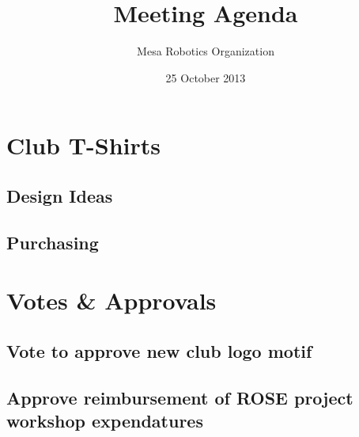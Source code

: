 \documentclass{article}
\begin{document}

\title{Meeting Agenda}
\author{Mesa Robotics Organization}
\date{25 October 2013}

\maketitle

\section{Club T-Shirts}
\subsection{Design Ideas}
\subsection{Purchasing}

\section{Votes \& Approvals}
\subsection{Vote to approve new club logo motif}
\subsection{Approve reimbursement of ROSE project workshop expendatures}

\end{document}
